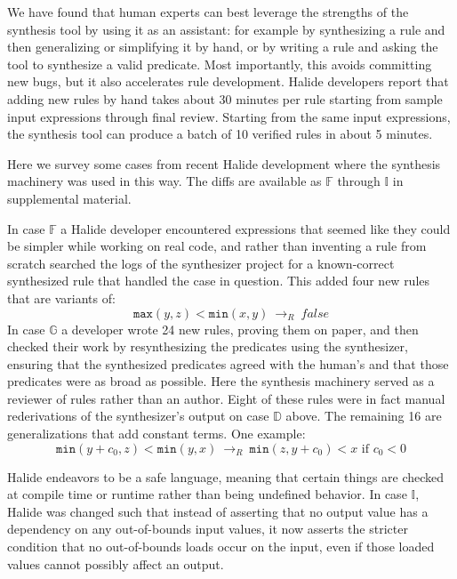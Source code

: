 \documentclass[acmsmall,review,anonymous]{acmart}\settopmatter{printfolios=true,printccs=false,printacmref=false}
\newcommand{\hmax}[0]{\texttt{max}}
\newcommand{\hmin}[0]{\texttt{min}}
\newcommand{\rewrites}[0]{\:\rightarrow_{R}\:}
\newcommand{\pred}[0]{\textrm{ if }}
\begin{document}

We have found that human experts can best leverage the strengths of the synthesis tool by using it as an assistant: for example by synthesizing a rule and then generalizing or simplifying it by hand, or by writing a rule and asking the tool to synthesize a valid predicate. Most importantly, this avoids committing new bugs, but it also accelerates rule development. Halide developers report that adding new rules by hand takes about 30 minutes per rule starting from sample input expressions through final review. Starting from the same input expressions, the synthesis tool can produce a batch of 10 verified rules in about 5 minutes.

Here we survey some cases from recent Halide development where the synthesis machinery was used in this way. The diffs are available as $\mathbb{F}$ through $\mathbb{I}$ in supplemental material. 

In case $\mathbb{F}$ a Halide developer encountered expressions that seemed like they could be simpler while working on real code, and rather than inventing a rule from scratch searched the logs of the synthesizer project for a known-correct synthesized rule that handled the case in question. This added four new rules that are variants of:
\[
\hmax(y, z) < \hmin(x, y) \rewrites \mathit{false}
\]
In case $\mathbb{G}$ a developer wrote 24 new rules, proving them on paper, and then checked their work by resynthesizing the predicates using the synthesizer, ensuring that the synthesized predicates agreed with the human’s and that those predicates were as broad as possible. Here the synthesis machinery served as a reviewer of rules rather than an author. Eight of these rules were in fact manual rederivations of the synthesizer’s output on case $\mathbb{D}$ above. The remaining 16 are generalizations that add constant terms. One example:
\[
\hmin(y + c_0, z) < \hmin(y, x) \rewrites \hmin(z, y + c_0) < x \pred c_0 < 0
\]

Halide endeavors to be a safe language, meaning that certain things are checked at compile time or runtime rather than being undefined behavior. In case $\mathbb{I}$, Halide was changed such that instead of asserting that no output value has a dependency on any out-of-bounds input values, it now asserts the stricter condition that no out-of-bounds loads occur on the input, even if those loaded values cannot possibly affect an output.
\end{document}

